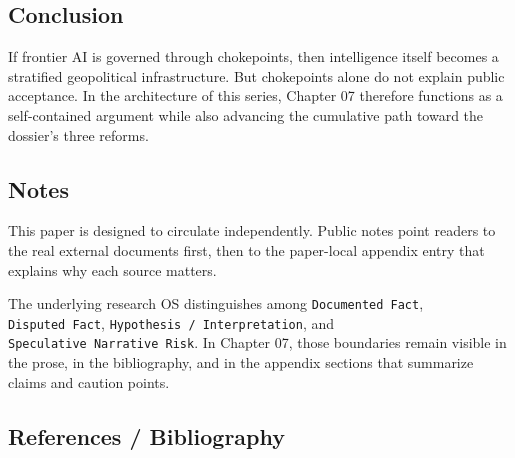 \documentclass[
  american,
  11pt,
  letterpaper,
]{article}
\begin{document}
\subsection{Conclusion}\label{conclusion-7}

If frontier AI is governed through chokepoints, then intelligence itself
becomes a stratified geopolitical infrastructure. But chokepoints alone
do not explain public acceptance. In the architecture of this series,
Chapter 07 therefore functions as a self-contained argument while also
advancing the cumulative path toward the dossier's three reforms.

\subsection{Notes}\label{notes-7}

This paper is designed to circulate independently. Public notes point
readers to the real external documents first, then to the paper-local
appendix entry that explains why each source matters.

The underlying research OS distinguishes among
\texttt{Documented\ Fact}, \texttt{Disputed\ Fact},
\texttt{Hypothesis\ /\ Interpretation}, and
\texttt{Speculative\ Narrative\ Risk}. In Chapter 07, those boundaries
remain visible in the prose, in the bibliography, and in the appendix
sections that summarize claims and caution points.

\subsection{References / Bibliography}\label{references-bibliography-7}
\end{document}
